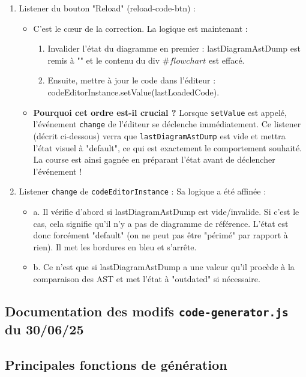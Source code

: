 \documentclass[11pt,a4paper]{article}
\begin{document}
\begin{enumerate}
    \item Listener du bouton "Reload" (reload-code-btn) :
    \begin{itemize}
        \item C'est le cœur de la correction. La logique est maintenant :
        \begin{enumerate}
            \item Invalider l'état du diagramme en premier : lastDiagramAstDump est remis à "" et le contenu du div $\#flowchart$ est effacé.
            \item Ensuite, mettre à jour le code dans l'éditeur : codeEditorInstance.setValue(lastLoadedCode).
        \end{enumerate}
        \item \textbf{Pourquoi cet ordre est-il crucial ?} Lorsque \texttt{setValue} est appelé, l'événement \texttt{change} de l'éditeur se déclenche immédiatement. Ce listener (décrit ci-dessous) verra que \texttt{lastDiagramAstDump} est vide et mettra l'état visuel à "default", ce qui est exactement le comportement souhaité. La course est ainsi gagnée en préparant l'état avant de déclencher l'événement !
    \end{itemize}

    \item Listener \texttt{change} de \texttt{codeEditorInstance} :
Sa logique a été affinée :
    \begin{itemize}
        \item a. Il vérifie d'abord si lastDiagramAstDump est vide/invalide. Si c'est le cas, cela signifie qu'il n'y a pas de diagramme de référence. L'état est donc forcément "default" (on ne peut pas être "périmé" par rapport à rien). Il met les bordures en bleu et s'arrête.
        \item b. Ce n'est que si lastDiagramAstDump a une valeur qu'il procède à la comparaison des AST et met l'état à "outdated" si nécessaire.
    \end{itemize}
    \end{enumerate}
\newpage

\subsection{Documentation des modifs \texttt{code-generator.js} du 30/06/25}

\subsection{Principales fonctions de génération }
\end{document}
